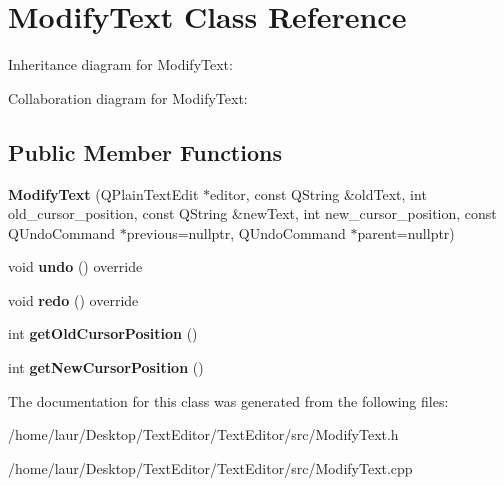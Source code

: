 \hypertarget{class_modify_text}{}\section{Modify\+Text Class Reference}
\label{class_modify_text}


Inheritance diagram for Modify\+Text\+:


Collaboration diagram for Modify\+Text\+:
\subsection*{Public Member Functions}
\begin{DoxyCompactItemize}
\item 
\mbox{\label{class_modify_text_af58856dcdb13efd7994e8d1044f3f8f1}} 
{\bfseries Modify\+Text} (Q\+Plain\+Text\+Edit $\ast$editor, const Q\+String \&old\+Text, int old\+\_\+cursor\+\_\+position, const Q\+String \&new\+Text, int new\+\_\+cursor\+\_\+position, const Q\+Undo\+Command $\ast$previous=nullptr, Q\+Undo\+Command $\ast$parent=nullptr)
\item 
\mbox{\label{class_modify_text_ac6f267ca4f2d3e6dd862975268291dab}} 
void {\bfseries undo} () override
\item 
\mbox{\label{class_modify_text_acf0fe8ee7ad397b66c012afe2aa1999d}} 
void {\bfseries redo} () override
\item 
\mbox{\label{class_modify_text_a35c4eb1c730d20b64a82b6d9b82445e9}} 
int {\bfseries get\+Old\+Cursor\+Position} ()
\item 
\mbox{\label{class_modify_text_acce2898bc8d96e9eeb69fcd10be47cdf}} 
int {\bfseries get\+New\+Cursor\+Position} ()
\end{DoxyCompactItemize}


The documentation for this class was generated from the following files\+:\begin{DoxyCompactItemize}
\item 
/home/laur/\+Desktop/\+Text\+Editor/\+Text\+Editor/src/Modify\+Text.\+h\item 
/home/laur/\+Desktop/\+Text\+Editor/\+Text\+Editor/src/Modify\+Text.\+cpp\end{DoxyCompactItemize}
